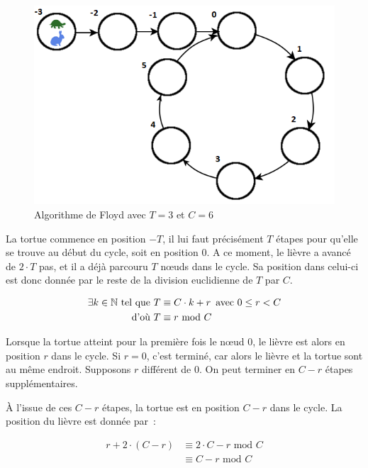         \begin{figure}
          \center{}
          \includegraphics[scale=0.5]{Floyd.png}
          \caption{Algorithme de Floyd avec $T=3$ et $C=6$}
        \end{figure}

        La tortue commence en position $-T$, il lui faut précisément $T$ étapes pour qu'elle se trouve au début du cycle, soit en position $0$. A ce moment, le lièvre a avancé de $2 \cdot T$ pas, et il a déjà parcouru $T$ nœuds dans le cycle. Sa position dans celui-ci est donc donnée par le reste de la division euclidienne de $T$ par $C$.

        \begin{align*}
          \exists k \in \mathbb{N} \text{\ tel que } T &\equiv C \cdot k + r \text{\, avec } 0 \leq r < C \\
                                        \text{d'où } T &\equiv r \text{\ mod } C
        \end{align*}

        Lorsque la tortue atteint pour la première fois le nœud $0$, le lièvre est alors en position $r$ dans le cycle. Si $r=0$, c'est terminé, car alors le lièvre et la tortue sont au même endroit. Supposons $r$ différent de $0$. On peut terminer en $C-r$ étapes supplémentaires.

        À l'issue de ces $C-r$ étapes, la tortue est en position $C-r$ dans le cycle. La position du lièvre est donnée par~:

        \begin{align*}
          r + 2 \cdot (C - r) &\equiv 2 \cdot C -r \text{\ mod } C \\
                              &\equiv C - r \text{\ mod } C
        \end{align*}

